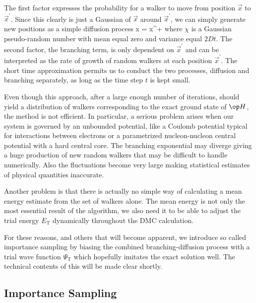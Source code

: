 The first factor expresses the probability for a walker to move from
position $\vec x$ to $\vec x^\prime$. Since this clearly is just a
Gaussian of $\vec x$ around $\vec x^\prime$, we can simply generate
new positions as a simple diffusion process
\bdm
\vec x = \vec x^\prime + \chi
\edm
where $\chi$ is a Gaussian pseudo-random number with mean equal zero
and variance equal $2Dt$. The second factor, the branching term, is
only dependent on $\vec x^\prime$ and can be interpreted as the rate
of growth of random walkers at each position $\vec x^\prime$. The
short time approximation permits us to conduct the two processes,
diffusion and branching separately, as long as the time step $t$ is
kept small.

Even though this approach, after a large enough number of iterations,
should yield a distribution of walkers corresponding to the exact
ground state of $\op H$, the method is not efficient. In particular, a
serious problem arises when our system is governed by an unbounded
potential, like a Coulomb potential typical for interactions between
electrons or a parametrized nucleon-nucleon central potential 
with a hard central core. The branching
exponential may diverge giving a huge production of new random walkers
that may be difficult to handle numerically. Also the fluctuations
become very large making statistical estimates of physical quantities
inaccurate.

Another problem is that there is actually no simple way of calculating
a mean energy estimate from the set of walkers alone. The mean energy
is not only the most essential result of the algorithm, we also need
it to be able to adjust the trial energy $E_\mathrm{T}$ dynamically
throughout the DMC calculation.

For these reasons, and others that will become apparent, we introduce
so called importance sampling by biasing the combined
branching-diffusion process with a trial wave function
$\Psi_\mathrm{T}$ which hopefully imitates the exact solution well.
The technical contents of this will be made clear shortly.


\subsection{Importance Sampling}

